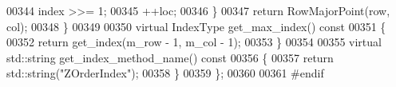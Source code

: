 \begin{DoxyCode}
00344                         index >>= 1;
00345                         ++loc;
00346                 \}
00347                 \textcolor{keywordflow}{return} RowMajorPoint(row, col);
00348         \}
00349 
00350         \textcolor{keyword}{virtual} IndexType get_max_index()\textcolor{keyword}{ const}
00351 \textcolor{keyword}{        }\{
00352                 \textcolor{keywordflow}{return} get_index(m\_row - 1, m\_col - 1);
00353         \}
00354 
00355         \textcolor{keyword}{virtual} std::string get_index_method_name()\textcolor{keyword}{ const}
00356 \textcolor{keyword}{        }\{
00357                 \textcolor{keywordflow}{return} std::string(\textcolor{stringliteral}{"ZOrderIndex"});
00358         \}
00359 \};
00360 
00361 \textcolor{preprocessor}{#endif}
\end{DoxyCode}
